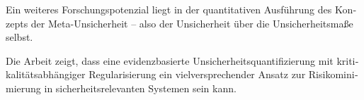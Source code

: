 \begin{otherlanguage}{ngerman}
Ein weiteres Forschungspotenzial liegt in der quantitativen Ausführung des Konzepts der Meta-Unsicherheit – also der Unsicherheit über die Unsicherheitsmaße selbst. 

Die Arbeit zeigt, dass eine evidenzbasierte Unsicherheitsquantifizierung mit kritikalitätsabhängiger Regularisierung ein vielversprechender Ansatz zur Risikominimierung in sicherheitsrelevanten Systemen sein kann.



\end{otherlanguage}